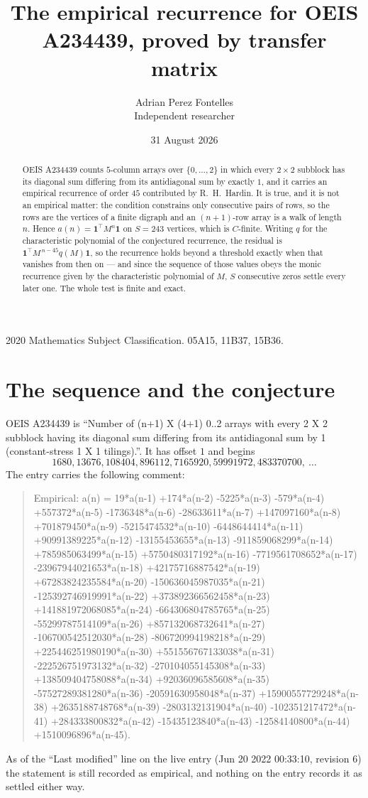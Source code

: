 \documentclass[11pt,a4paper]{article}
\title{The empirical recurrence for OEIS A234439, proved by transfer matrix}
\author{Adrian Perez Fontelles\\ \small Independent researcher}
\date{31 August 2026}
\theoremstyle{plain}
\theoremstyle{definition}
\begin{document}
\maketitle

\begin{abstract}
OEIS A234439 counts $5$-column arrays over $\{0,\dots,2\}$ in which every
$2\times2$ subblock has its diagonal sum differing from its antidiagonal sum by
exactly $1$, and it
carries an empirical recurrence of order $45$ contributed by R.~H.~Hardin. It is true,
and it is not an empirical matter: the condition constrains only consecutive pairs of rows,
so the rows are the vertices of a finite digraph and an $(n+1)$-row array is a walk of
length $n$. Hence $a(n)=\mathbf{1}^{\!\top}M^{n}\mathbf{1}$ on $S=243$ vertices, which
is $C$-finite. Writing $q$ for the characteristic polynomial of the conjectured recurrence,
the residual is $\mathbf{1}^{\!\top}M^{\,n-45}q(M)\mathbf{1}$, so the recurrence
holds beyond a threshold exactly when that vanishes from then on --- and since the sequence
of those values obeys the monic recurrence given by the characteristic polynomial of $M$,
$S$ consecutive zeros settle every later one. The whole test is finite and exact.
\end{abstract}

\noindent\small 2020 Mathematics Subject Classification. 05A15, 11B37, 15B36.\normalsize

\section{The sequence and the conjecture}

OEIS A234439 is ``Number of (n+1) X (4+1) 0..2 arrays with every 2 X 2 subblock having its diagonal sum differing from its antidiagonal sum by 1 (constant-stress 1 X 1 tilings).''. It has offset
$1$ and begins
\[
1680, 13676, 108404, 896112, 7165920, 59991972, 483370700,\ \dots
\]
The entry carries the following comment:
\begin{quote}\small
Empirical: a(n) = 19*a(n-1) +174*a(n-2) -5225*a(n-3) -579*a(n-4) +557372*a(n-5) -1736348*a(n-6) -28633611*a(n-7) +147097160*a(n-8) +701879450*a(n-9) -5215474532*a(n-10) -6448644414*a(n-11) +90991389225*a(n-12) -13155453655*a(n-13) -911859068299*a(n-14) +785985063499*a(n-15) +5750480317192*a(n-16) -7719561708652*a(n-17) -23967944021653*a(n-18) +42175716887542*a(n-19) +67283824235584*a(n-20) -150636045987035*a(n-21) -125392746919991*a(n-22) +373892366562458*a(n-23) +141881972068085*a(n-24) -664306804785765*a(n-25) -55299787514109*a(n-26) +857132068732641*a(n-27) -106700542512030*a(n-28) -806720994198218*a(n-29) +225446251980190*a(n-30) +551556767133038*a(n-31) -222526751973132*a(n-32) -270104055145308*a(n-33) +138509404758088*a(n-34) +92036096585608*a(n-35) -57527289381280*a(n-36) -20591630958048*a(n-37) +15900557729248*a(n-38) +2635188748768*a(n-39) -2803132131904*a(n-40) -102351217472*a(n-41) +284333800832*a(n-42) -15435123840*a(n-43) -12584140800*a(n-44) +1510096896*a(n-45).
\end{quote}
As of the ``Last modified'' line on the live entry (Jun 20 2022 00:33:10, revision 6) the statement is
still recorded as empirical, and nothing on the entry records it as settled either way.
\end{document}
